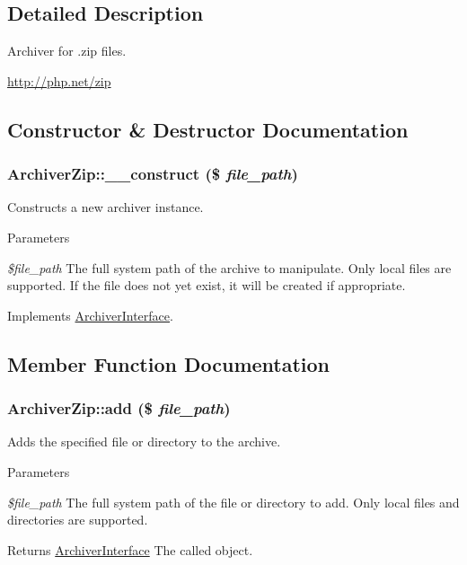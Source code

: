 \subsection{Detailed Description}
Archiver for .zip files.

\hyperlink{}{http://php.net/zip}

\subsection{Constructor \& Destructor Documentation}
\hypertarget{classArchiverZip_adfe750d331bb6910529f1326bdab2947}{
\subsubsection[{\_\-\_\-construct}]{\setlength{\rightskip}{0pt plus 5cm}ArchiverZip::\_\-\_\-construct (\$ {\em file\_\-path})}}
\label{classArchiverZip_adfe750d331bb6910529f1326bdab2947}
Constructs a new archiver instance.


\begin{DoxyParams}{Parameters}
\item[{\em \$file\_\-path}]The full system path of the archive to manipulate. Only local files are supported. If the file does not yet exist, it will be created if appropriate. \end{DoxyParams}


Implements \hyperlink{interfaceArchiverInterface_aa380cf3e1bcf80763ccd6c790b50aee5}{ArchiverInterface}.

\subsection{Member Function Documentation}
\hypertarget{classArchiverZip_a9f16632d5096932af9b0483f678c192c}{
\subsubsection[{add}]{\setlength{\rightskip}{0pt plus 5cm}ArchiverZip::add (\$ {\em file\_\-path})}}
\label{classArchiverZip_a9f16632d5096932af9b0483f678c192c}
Adds the specified file or directory to the archive.


\begin{DoxyParams}{Parameters}
\item[{\em \$file\_\-path}]The full system path of the file or directory to add. Only local files and directories are supported.\end{DoxyParams}
\begin{DoxyReturn}{Returns}
\hyperlink{interfaceArchiverInterface}{ArchiverInterface} The called object. 
\end{DoxyReturn}


